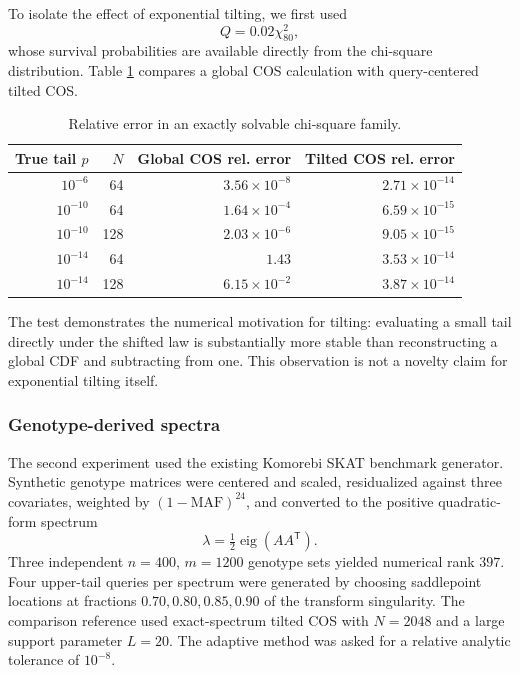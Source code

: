 \documentclass[11pt]{article}
\theoremstyle{definition}
\theoremstyle{remark}
\begin{document}
To isolate the effect of exponential tilting, we first used
\[
Q=0.02\chi^2_{80},
\]
whose survival probabilities are available directly from the chi-square distribution. Table \ref{tab:chi} compares a global COS calculation with query-centered tilted COS.

\begin{table}[htbp]
\centering
\caption{Relative error in an exactly solvable chi-square family.}
\label{tab:chi}
\begin{tabular}{rrrr}
\toprule
True tail $p$ & $N$ & Global COS rel. error & Tilted COS rel. error\\
\midrule
$10^{-6}$  & 64  & $3.56\times10^{-8}$ & $2.71\times10^{-14}$\\
$10^{-10}$ & 64  & $1.64\times10^{-4}$ & $6.59\times10^{-15}$\\
$10^{-10}$ & 128 & $2.03\times10^{-6}$ & $9.05\times10^{-15}$\\
$10^{-14}$ & 64  & $1.43$              & $3.53\times10^{-14}$\\
$10^{-14}$ & 128 & $6.15\times10^{-2}$ & $3.87\times10^{-14}$\\
\bottomrule
\end{tabular}
\end{table}

The test demonstrates the numerical motivation for tilting: evaluating a small tail directly under the shifted law is substantially more stable than reconstructing a global CDF and subtracting from one. This observation is not a novelty claim for exponential tilting itself.

\subsubsection{Genotype-derived spectra}

The second experiment used the existing Komorebi SKAT benchmark generator. Synthetic genotype matrices were centered and scaled, residualized against three covariates, weighted by $(1-\mathrm{MAF})^{24}$, and converted to the positive quadratic-form spectrum
\[
\lambda=\tfrac12\operatorname{eig}(AA^{\mathsf T}).
\]
Three independent $n=400$, $m=1200$ genotype sets yielded numerical rank $397$. Four upper-tail queries per spectrum were generated by choosing saddlepoint locations at fractions $0.70,0.80,0.85,0.90$ of the transform singularity. The comparison reference used exact-spectrum tilted COS with $N=2048$ and a large support parameter $L=20$. The adaptive method was asked for a relative analytic tolerance of $10^{-8}$.
\end{document}
